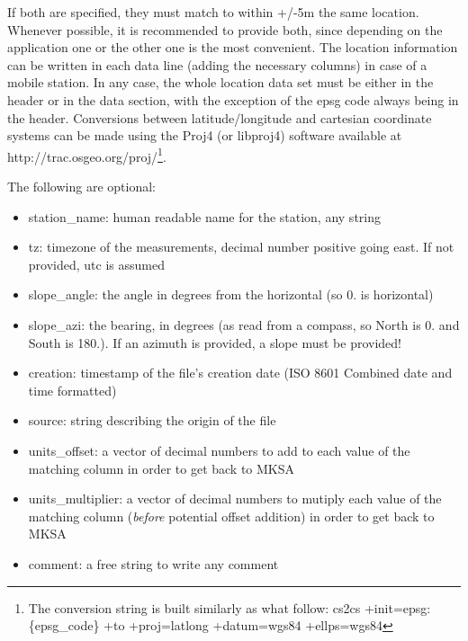\documentclass[a4paper,10pt]{article}
\begin{document}
If both are specified, they must match to within +/-5m the same location. Whenever possible, it is recommended to provide both, since depending on the application one or the other one is the most convenient. The location information can be written in each data line (adding the necessary columns) in case of a mobile station. In any case, the whole location data set must be either in the header or in the data section, with the exception of the epsg code always being in the header. Conversions between latitude/longitude and cartesian coordinate systems can be made using the Proj4 (or libproj4) software available at http://trac.osgeo.org/proj/\footnote{The conversion string is built similarly as what follow: cs2cs +init=epsg:\{epsg\_code\} +to +proj=latlong +datum=wgs84 +ellps=wgs84}.

The following are optional:
\begin{itemize}
	\item station\_name: human readable name for the station, any string
	\item tz: timezone of the measurements, decimal number positive going east. If not provided, utc is assumed
	\item slope\_angle: the angle in degrees from the horizontal (so 0. is horizontal)
	\item slope\_azi: the bearing, in degrees (as read from a compass, so North is 0. and South is 180.). If an azimuth is provided, a slope must be provided!
	\item creation: timestamp of the file's creation date (ISO 8601 Combined date and time formatted)
	\item source: string describing the origin of the file
	\item units\_offset: a vector of decimal numbers to add to each value of the matching column in order to get back to MKSA
	\item units\_multiplier: a vector of decimal numbers to mutiply each value of the matching column (\emph{before} potential offset addition) in order to get back to MKSA
	\item comment: a free string to write any comment
\end{itemize}
\end{document}
